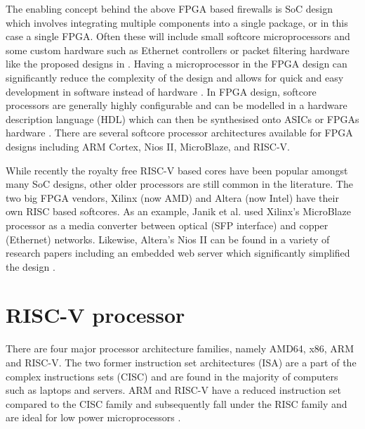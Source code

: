The enabling concept behind the above FPGA based firewalls is SoC design which involves integrating multiple components into a single package, or in this case a 
single FPGA. Often these will include small softcore microprocessors and some custom hardware such as Ethernet controllers or packet filtering hardware like the proposed designs in \cite{LwIPFPGAFirewall}.
Having a microprocessor in the FPGA design can significantly reduce the complexity of the design and allows for quick and easy development in software instead of hardware \cite{SoftcoreBasedEmbeddedSystems}. In FPGA design, softcore processors are generally highly configurable and can be modelled in a hardware description language (HDL) which can then be synthesised onto ASICs or FPGAs hardware \cite{SoftcoreBasedEmbeddedSystems}. There are several softcore processor architectures available for FPGA designs including ARM Cortex, Nios II, MicroBlaze, and RISC-V. 
 
While recently the royalty free RISC-V based cores have been popular amongst many SoC designs, other older processors are still common in the literature. The two big FPGA vendors, Xilinx (now AMD) and Altera (now Intel) have their own RISC based softcores. As an example, Janik et al. \cite{LwIPMicroblaze} used Xilinx's MicroBlaze processor as a media converter between optical (SFP interface) and copper (Ethernet) networks. Likewise, Altera's Nios II can be found in a variety of research papers including an embedded web server which significantly simplified the design \cite{NiosIIWebserver}. 

 







\section{RISC-V processor}
There are four major processor architecture families, namely AMD64, x86, ARM and RISC-V. The two former instruction set architectures (ISA) 
are a part of the complex instructions sets (CISC) and are found in the majority of computers such as laptops and servers. ARM and RISC-V have a reduced instruction set compared to the CISC family and subsequently fall under the RISC family and are ideal for low power microprocessors \cite{RV16Embedded}.

